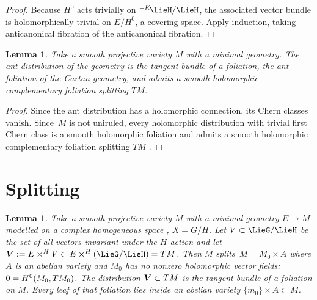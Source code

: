 \documentclass[11pt]{article}
\numberwithin{equation}{section}
\numberwithin{equation}{section}
\newtheorem{Lemma}[Theorem]{Lemma}
\newcommand*{\acf}[1]{\Iitaka[\acb{}]{#1}}
\begin{document}
\begin{proof}
Because $H^0$ acts trivially on $\acf\LieH/\LieH$, the associated vector bundle is
holomorphically trivial on $E/H^0$, a covering space.
Apply induction, taking anticanonical fibration of the anticanonical fibration.
\end{proof}

\begin{Lemma}
Take a smooth projective variety $M$ with a minimal geometry.
The ant distribution of the geometry is the tangent bundle of a foliation, the \emph{ant foliation} of the Cartan geometry, and admits a smooth holomorphic complementary foliation splitting $TM$.
\end{Lemma}

\begin{proof}
Since the ant distribution has a holomorphic connection, its Chern classes vanish.
Since~$M$ is not uniruled, every holomorphic distribution with trivial first Chern class is a smooth holomorphic foliation and admits a smooth holomorphic complementary foliation splitting $TM$ \cite[Theorem 5.2]{Loray/Pereira/Touzet:2011}.
\end{proof}

\section{Splitting}\label{section:splitting}

\begin{Lemma}\label{lemma:symmetry.splitting}
Take a smooth projective variety $M$ with a minimal geometry $E \to M$ modelled on a complex homogeneous space , $X = G/H$.
Let $V \subset \LieG/\LieH$ be the set of all vectors invariant under the $H$-action and let $\vb{V}:= E \times^H V \subset E \times^H \pr{\LieG/\LieH} = TM$.
Then $M$ splits~${M = M_0 \times A}$ where $A$ is an abelian variety and $M_0$ has no nonzero holomorphic vector fields: $0=\cohomology{0}{M_0,TM_0}$.
The distribution ${\bm{V}} \subset TM$ is the tangent bundle of a foliation on $M$.
Every leaf of that foliation lies inside an abelian variety $\{m_0\} \times A \subset M$.
\end{Lemma}
\end{document}
